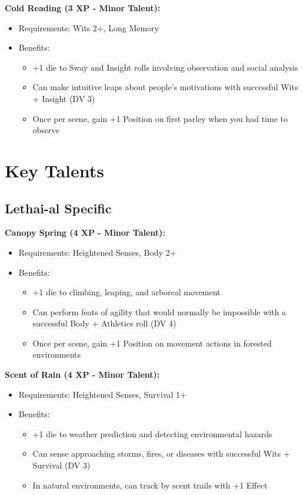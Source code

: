 \documentclass[11pt]{article}
\newcommand{\talent}[1]{\textbf{#1}}
\begin{document}
\talent{Cold Reading (3 XP - Minor Talent):}
\begin{itemize}
  \item Requirements: Wits 2+, Long Memory
  \item Benefits:
    \begin{itemize}
      \item +1 die to Sway and Insight rolls involving observation and social analysis
      \item Can make intuitive leaps about people's motivations with successful Wits + Insight (DV 3)
      \item Once per scene, gain +1 Position on first parley when you had time to observe
    \end{itemize}
\end{itemize}

\section*{Key Talents}

\subsection*{Lethai-al Specific}
\talent{Canopy Spring (4 XP - Minor Talent):}
\begin{itemize}
  \item Requirements: Heightened Senses, Body 2+
  \item Benefits:
    \begin{itemize}
      \item +1 die to climbing, leaping, and arboreal movement
      \item Can perform feats of agility that would normally be impossible with a successful Body + Athletics roll (DV 4)
      \item Once per scene, gain +1 Position on movement actions in forested environments
    \end{itemize}
\end{itemize}

\talent{Scent of Rain (4 XP - Minor Talent):}
\begin{itemize}
  \item Requirements: Heightened Senses, Survival 1+
  \item Benefits:
    \begin{itemize}
      \item +1 die to weather prediction and detecting environmental hazards
      \item Can sense approaching storms, fires, or diseases with successful Wits + Survival (DV 3)
      \item In natural environments, can track by scent trails with +1 Effect
    \end{itemize}
\end{itemize}
\end{document}
